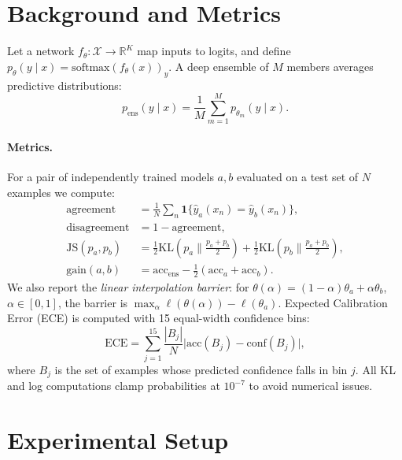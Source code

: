 \documentclass[11pt]{article}
\begin{document}
\section{Background and Metrics}
\label{sec:background}

Let a network $f_\theta : \mathcal{X} \to \mathbb{R}^K$ map inputs to
logits, and define $p_\theta(y \mid x) = \mathrm{softmax}(f_\theta(x))_y$.
A deep ensemble of $M$ members averages predictive distributions:
\[
  p_{\mathrm{ens}}(y \mid x)
  = \frac{1}{M}\sum_{m=1}^M p_{\theta_m}(y \mid x).
\]

\paragraph{Metrics.}
For a pair of independently trained models $a,b$ evaluated on a test set
of $N$ examples we compute:
\begin{align*}
  \mathrm{agreement}
  &= \frac{1}{N}\sum_n \mathbf{1}\{\hat{y}_a(x_n) = \hat{y}_b(x_n)\},\\
  \mathrm{disagreement}
  &= 1 - \mathrm{agreement},\\
  \mathrm{JS}(p_a,p_b)
  &= \tfrac{1}{2}\mathrm{KL}(p_a\|\tfrac{p_a+p_b}{2})
   + \tfrac{1}{2}\mathrm{KL}(p_b\|\tfrac{p_a+p_b}{2}),\\
  \mathrm{gain}(a,b)
  &= \mathrm{acc}_{\mathrm{ens}} - \tfrac{1}{2}(\mathrm{acc}_a + \mathrm{acc}_b).
\end{align*}
We also report the \emph{linear interpolation barrier}: for
$\theta(\alpha)=(1-\alpha)\theta_a + \alpha\theta_b$, $\alpha\in[0,1]$,
the barrier is $\max_\alpha \ell(\theta(\alpha)) - \ell(\theta_a)$.
Expected Calibration Error (ECE) is computed with 15 equal-width
confidence bins:
\[
  \mathrm{ECE}
  = \sum_{j=1}^{15} \frac{|B_j|}{N}
    \bigl|\mathrm{acc}(B_j) - \mathrm{conf}(B_j)\bigr|,
\]
where $B_j$ is the set of examples whose predicted confidence falls in
bin $j$.  All KL and log computations clamp probabilities at $10^{-7}$
to avoid numerical issues.

\section{Experimental Setup}
\label{sec:setup}
\end{document}
